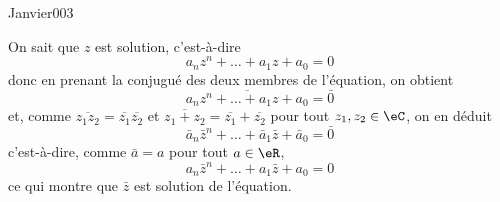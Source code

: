 \begin{corrige}{Janvier003}

On sait que $z$ est solution, c'est-à-dire
\begin{equation*}
  a_n z^n + \ldots + a_1 z + a_0 = 0
\end{equation*}
donc en prenant la conjugué des deux membres de l'équation, on obtient
\begin{equation*}
  \overline{a_n z^n + \ldots + a_1 z + a_0} = \bar 0
\end{equation*}
et, comme $\overline{z_1 z_2} = \overline{z_1} \overline{z_2}$ et
$\overline{z_1 + z_2} = \overline{z_1} + \overline{z_2}$ pour tout
$z_1, z_2 \in \eC$, on en déduit
\begin{equation*}
    \bar a_n\bar z^n + \ldots + \bar a_1\bar z +\bar a_0 = \bar 0
\end{equation*}
c'est-à-dire, comme $\bar a = a$ pour tout $a \in \eR$,
\begin{equation*}
  a_n \bar z^n + \ldots + a_1\bar z + a_0 = 0  
\end{equation*}
ce qui montre que $\bar z$ est solution de l'équation.


\end{corrige}
